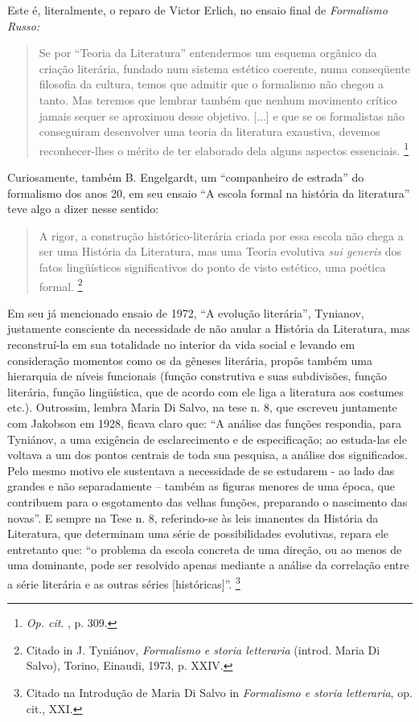 Este é, literalmente, o reparo de Victor Erlich, no ensaio final de
\emph{Formalismo Russo:}

\begin{quote}
Se por ``Teoria da Literatura'' entendermos um esquema orgânico da
criação literária, fundado num sistema estético coerente, numa
conseqüente filosofia da cultura, temos que admitir que o formalismo não
chegou a tanto. Mas teremos que lembrar também que nenhum movimento
crítico jamais sequer se aproximou desse objetivo. {[}...{]} e que se os
formalistas não conseguiram desenvolver uma teoria da literatura
exaustiva, devemos reconhecer-lhes o mérito de ter elaborado dela alguns
aspectos essenciais. \footnote{\emph{Op. cit}. , p. 309.}
\end{quote}

Curiosamente, também B. Engelgardt, um ``companheiro de estrada'' do
formalismo dos anos 20, em seu ensaio ``A escola formal na história da
literatura'' teve algo a dizer nesse sentido:

\begin{quote}
A rigor, a construção histórico-literária criada por essa escola não
chega a ser uma História da Literatura, mas uma Teoria evolutiva
\emph{sui generis} dos fatos lingüísticos significativos do ponto de
visto estético, uma poética formal. \footnote{Citado in J. Tyniánov,
  \emph{Formalismo e storia letteraria} (introd. Maria Di Salvo),
  Torino, Einaudi, 1973, p. XXIV.}
\end{quote}

Em seu já mencionado ensaio de 1972, ``A evolução literária'', Tynianov,
justamente consciente da necessidade de não anular a História da
Literatura, mas reconstruí-la em sua totalidade no interior da vida
social e levando em consideração momentos como os da gêneses literária,
propôs também uma hierarquia de níveis funcionais (função construtiva e
suas subdivisões, função literária, função lingüística, que de acordo
com ele liga a literatura aos costumes etc.). Outrossim, lembra Maria Di
Salvo, na tese n. 8, que escreveu juntamente com Jakobson em 1928,
ficava claro que: ``A análise das funções respondia, para Tyniánov, a
uma exigência de esclarecimento e de especificação; ao estuda-las ele
voltava a um dos pontos centrais de toda sua pesquisa, a análise dos
significados. Pelo mesmo motivo ele sustentava a necessidade de se
estudarem - ao lado das grandes e não separadamente -- também as figuras
menores de uma época, que contribuem para o esgotamento das velhas
funções, preparando o nascimento das novas''. E sempre na Tese n. 8,
referindo-se às leis imanentes da História da Literatura, que determinam
uma série de possibilidades evolutivas, repara ele entretanto que: ``o
problema da escola concreta de uma direção, ou ao menos de uma
dominante, pode ser resolvido apenas mediante a análise da correlação
entre a série literária e as outras séries {[}históricas{]}''.
\footnote{Citado na Introdução de Maria Di Salvo in \emph{Formalismo e
  storia letteraria}, op. cit., XXI.}

